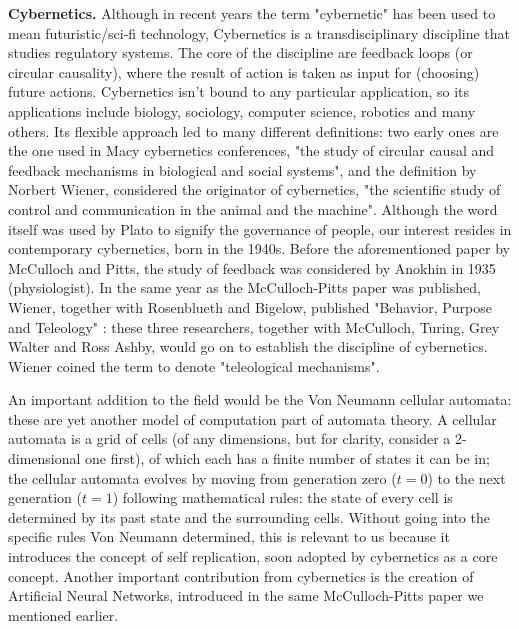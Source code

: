 \documentclass[../main.tex]{subfiles}
\begin{document}
\vspace{4pt}
\textbf{Cybernetics.} Although in recent years the term "cybernetic" has been used to mean futuristic/sci-fi technology, Cybernetics is a transdisciplinary discipline that studies regulatory systems. The core of the discipline are feedback loops (or circular causality), where the result of action is taken as input for (choosing) future actions. Cybernetics isn't bound to any particular application, so its applications include biology, sociology, computer science, robotics and many others. Its flexible approach led to many different definitions: two early ones are the one used in Macy cybernetics conferences, "the study of circular causal and feedback mechanisms in biological and social systems"\cite{steerCyberneticsCircularCausal1952}, and the definition by Norbert Wiener, considered the originator of cybernetics, "the scientific study of control and communication in the animal and the machine"\cite{wienerCyberneticsControlCommunication1961}. Although the word itself was used by Plato to signify the governance of people, our interest resides in contemporary cybernetics, born in the 1940s. Before the aforementioned paper by McCulloch and Pitts, the study of feedback was considered by Anokhin in 1935 \cite{anokhinProblemsCentrePeriphery1935} (physiologist). In the same year as the McCulloch-Pitts paper was published, Wiener, together with Rosenblueth and Bigelow, published "Behavior, Purpose and Teleology" \cite{rosenbluethBehaviorPurposeTeleology1943}: these three researchers, together with McCulloch, Turing, Grey Walter and Ross Ashby, would go on to establish the discipline of cybernetics. Wiener coined the term to denote "teleological mechanisms".

An important addition to the field would be the Von Neumann cellular automata: these are yet another model of computation part of automata theory. A cellular automata is a grid of cells (of any dimensions, but for clarity, consider a 2-dimensional one first), of which each has a finite number of states it can be in; the cellular automata evolves by moving from generation zero ($t=0$) to the next generation ($t=1$) following mathematical rules: the state of every cell is determined by its past state and the surrounding cells. Without going into the specific rules Von Neumann determined, this is relevant to us because it introduces the concept of self replication, soon adopted by cybernetics as a core concept. Another important contribution from cybernetics is the creation of Artificial Neural Networks, introduced in the same McCulloch-Pitts paper we mentioned earlier.
\end{document}
